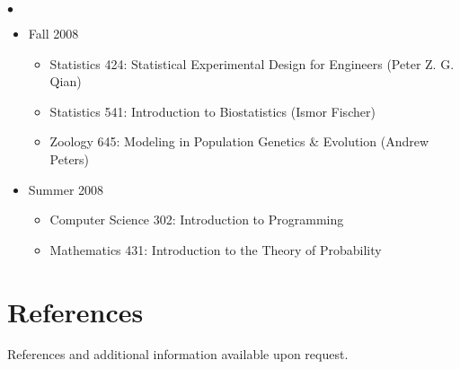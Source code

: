 \documentclass[margin,line,10pt]{res}
\newenvironment{list2}{
  \begin{list}{$\bullet$}{%
      \setlength{\itemsep}{0in}
      \setlength{\parsep}{0in} \setlength{\parskip}{0in}
      \setlength{\topsep}{0in} \setlength{\partopsep}{0in} 
      \setlength{\leftmargin}{0.2in}}}{\end{list}}
\begin{document}
\begin{resume}
\begin{list2}
\begin{itemize}
\item Fall 2008
\begin{itemize}
\item Statistics 424: Statistical Experimental Design for Engineers (Peter Z. G. Qian)
\item Statistics 541: Introduction to Biostatistics (Ismor Fischer)
\item Zoology 645: Modeling in Population Genetics \& Evolution (Andrew Peters)
\end{itemize}

\item Summer 2008
\begin{itemize}
\item Computer Science 302: Introduction to Programming
\item Mathematics 431: Introduction to the Theory of Probability
\end{itemize}

  \end{itemize}

 
  
\end{list2}




\vspace{0.5cm}
\section{\sc References}
References and additional information available upon request. 

\begin{comment}
\begin{tabular}{ll}
[1] & {\bf \underline{Daniel Gianola}}, Ph.D. Sewall Wright Professor of Animal Breeding and Genetics. \\
    & Department of Animal Sciences, University of Wisconsin-Madison. \\ 
    & Address: 1675 Observatory Dr. Madison, WI 53706-1284.  \\
    & E-mail: gianola -at- ansci.wisc.edu, Phone: 608-265-2054
\end{tabular}
\end{comment}



\end{resume}
\end{document}

